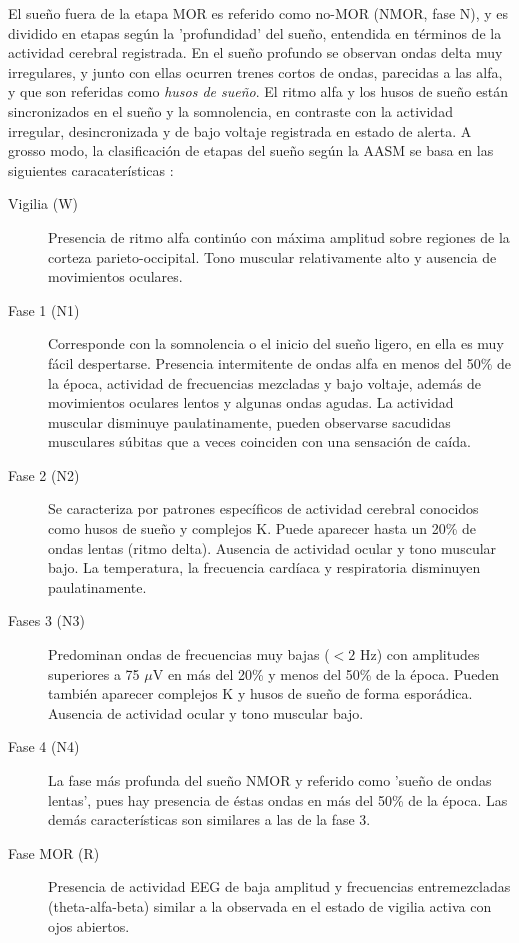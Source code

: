 \documentclass[12pt,a4paper]{mitthesis}
\begin{document}
El sue\~no fuera de la etapa MOR es referido como no-MOR (NMOR, fase N), y es dividido en etapas 
seg\'un la 'profundidad' del sue\~no, entendida en t\'erminos de la actividad cerebral registrada.
En el sue\~no profundo se observan ondas delta muy irregulares, y junto con ellas ocurren trenes 
cortos de ondas, parecidas a las alfa, y que son referidas como \textit{husos de sue\~no}. 
El ritmo alfa y los husos de sue\~no est\'an sincronizados en el sue\~no y la somnolencia, en 
contraste con la actividad irregular, desincronizada y de bajo voltaje registrada en estado de 
alerta.
A grosso modo, la clasificaci\'on de etapas del sue\~no seg\'un la AASM se basa en las siguientes
caracater\'isticas \cite{Hori01}:

\begin{description}
\item[Vigilia (W)] Presencia de ritmo alfa contin\'uo con m\'axima amplitud sobre regiones de la 
corteza parieto-occipital. Tono muscular relativamente alto y ausencia de movimientos oculares.

\item[Fase 1 (N1)] Corresponde con la somnolencia o el inicio del sue\~no ligero, en ella es muy 
f\'acil despertarse. 
Presencia intermitente de ondas alfa en menos del 50\% de la \'epoca, actividad de frecuencias 
mezcladas y bajo voltaje, adem\'as de movimientos oculares lentos y algunas ondas agudas. 
La actividad muscular disminuye paulatinamente, pueden observarse sacudidas musculares s\'ubitas 
que a veces coinciden con una sensación de ca\'ida. 

\item[Fase 2 (N2)] Se caracteriza por patrones espec\'ificos de actividad cerebral conocidos como 
husos de sue\~no y complejos K. 
Puede aparecer hasta un 20\% de ondas lentas (ritmo delta). Ausencia de actividad 
ocular y tono muscular bajo.
La temperatura, la frecuencia card\'iaca y respiratoria disminuyen paulatinamente. 

\item[Fases 3 (N3)] Predominan ondas de frecuencias muy bajas ($<2$ Hz) con amplitudes 
superiores a 75 $\mu$V en m\'as del 20\% y menos del 50\% de la \'epoca. Pueden tambi\'en aparecer 
complejos K y husos de sue\~no de forma espor\'adica. Ausencia de actividad ocular y tono muscular 
bajo.

\item[Fase 4 (N4)] La fase m\'as profunda del sue\~no NMOR y referido como 'sue\~no de ondas 
lentas', pues hay presencia de \'estas ondas en m\'as del 50\% de la época. Las dem\'as 
caracter\'isticas son similares a las de la fase 3.

\item[Fase MOR (R)] Presencia de actividad EEG de baja amplitud y frecuencias entremezcladas 
(theta-alfa-beta) similar a la observada en el estado de vigilia activa con ojos abiertos.
\end{description}
\end{document}
